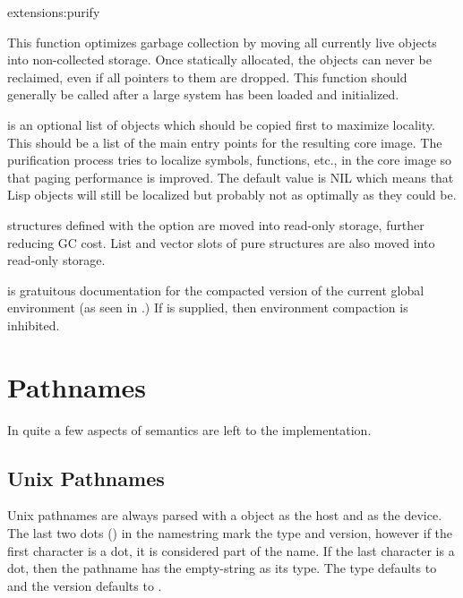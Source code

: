 \begin{defun}{extensions:}{purify}{
    }
  
  This function optimizes garbage collection by moving all currently
  live objects into non-collected storage.  Once statically allocated,
  the objects can never be reclaimed, even if all pointers to them are
  dropped.  This function should generally be called after a large
  system has been loaded and initialized.

  \begin{Lentry}
  \item[\kwd{root-structures}] is an optional list of objects which
    should be copied first to maximize locality.  This should be a
    list of the main entry points for the resulting core image.  The
    purification process tries to localize symbols, functions, etc.,
    in the core image so that paging performance is improved.  The
    default value is NIL which means that Lisp objects will still be
    localized but probably not as optimally as they could be.
  
     structures defined with the 
    option are moved into read-only storage, further reducing GC cost.
    List and vector slots of pure structures are also moved into
    read-only storage.
  
  \item[\kwd{environment-name}] is gratuitous documentation for the
    compacted version of the current global environment (as seen in
    .)  If \false{} is supplied, then
    environment compaction is inhibited.
  \end{Lentry}
\end{defun}


\section{Pathnames}

In \clisp{} quite a few aspects of  semantics are left to
the implementation.  


\subsection{Unix Pathnames}

Unix pathnames are always parsed with a  object as the host and
 as the device.  The last two dots () in the namestring mark
the type and version, however if the first character is a dot, it is considered
part of the name.  If the last character is a dot, then the pathname has the
empty-string as its type.  The type defaults to  and the version
defaults to .

